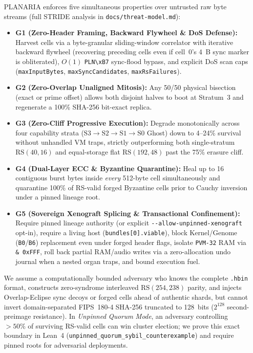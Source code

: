\documentclass[11pt,letterpaper]{article}
\theoremstyle{remark}
\begin{document}
PLANARIA enforces five simultaneous properties over untrusted raw byte streams (full STRIDE analysis in \texttt{docs/threat-model.md}):
\begin{itemize}[leftmargin=1.6em, itemsep=1.5pt]
  \item \textbf{G1 (Zero-Header Framing, Backward Flywheel \& DoS Defense):} Harvest cells via a byte-granular sliding-window correlator with iterative backward flywheel (recovering preceding cells even if cell~0's 4~B sync marker is obliterated), $O(1)$ \texttt{PLN\textbackslash xB7} sync-flood bypass, and explicit DoS scan caps (\texttt{maxInputBytes}, \texttt{maxSyncCandidates}, \texttt{maxRsFailures}).
  \item \textbf{G2 (Zero-Overlap Unaligned Mitosis):} Any 50/50 physical bisection (exact or prime offset) allows both disjoint halves to boot at Stratum~3 and regenerate a 100\% SHA-256 bit-exact replica.
  \item \textbf{G3 (Zero-Cliff Progressive Execution):} Degrade monotonically across four capability strata ($\mathrm{S3}\to\mathrm{S2}\to\mathrm{S1}\to\mathrm{S0}$ Ghost) down to 4--24\% survival without unhandled VM traps, strictly outperforming both single-stratum $\mathrm{RS}(40,16)$ and equal-storage flat $\mathrm{RS}(192,48)$ past the 75\% erasure cliff.
  \item \textbf{G4 (Dual-Layer ECC \& Byzantine Quarantine):} Heal up to 16 contiguous burst bytes inside \emph{every} 512-byte cell simultaneously and quarantine 100\% of RS-valid forged Byzantine cells prior to Cauchy inversion under a pinned lineage root.
  \item \textbf{G5 (Sovereign Xenograft Splicing \& Transactional Confinement):} Require pinned lineage authority (or explicit \nolinkurl{--allow-unpinned-xenograft} opt-in), require a living host (\nolinkurl{bundles[0].viable}), block Kernel/Genome (\texttt{B0}/\texttt{B6}) replacement even under forged header flags, isolate \texttt{PVM-32} RAM via \texttt{\& 0xFFF}, roll back partial RAM/audio writes via a zero-allocation undo journal when a nested organ traps, and bound execution fuel.
\end{itemize}

We assume a computationally bounded adversary who knows the complete \texttt{.hbin} format, constructs zero-syndrome interleaved $\mathrm{RS}(254,238)$ parity, and injects Overlap-Eclipse sync decoys or forged cells ahead of authentic shards, but cannot invert domain-separated FIPS~180-4 SHA-256 \cite{fips180} truncated to 128~bits ($2^{128}$ second-preimage resistance). In \emph{Unpinned Quorum Mode}, an adversary controlling $>50\%$ of surviving RS-valid cells can win cluster election; we prove this exact boundary in Lean~4 (\texttt{unpinned\_\allowbreak quorum\_\allowbreak sybil\_\allowbreak counterexample}) and require pinned roots for adversarial deployments.
\end{document}
